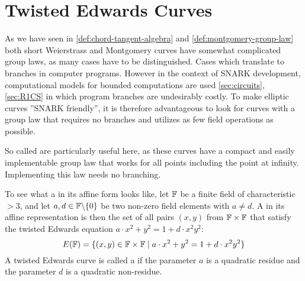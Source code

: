 
\section{Twisted Edwards Curves}\label{sec:edwards}
As we have seen in \ref{def:chord-tangent-algebra} and \ref{def:montgomery-group-law} both short Weierstrass and Montgomery curves have somewhat complicated group laws, as many cases have to be distinguished. Cases which translate to branches in computer programs. However in the context of SNARK development, computational models for bounded computations are used \ref{sec:circuits}, \ref{sec:R1CS} in which program branches are undesirably costly.  To make elliptic curves ''SNARK friendly'', it is therefore advantageous to look for curves with a group law that requires no branches and utilizes as few field operations as possible.

So called  are particularly useful here, as these curves have a compact and easily implementable group law that works for all points including the point at infinity. Implementing this law needs no branching. 

To see what a  in its affine form looks like, let $\mathbb{F}$ be a finite field of characteristic $>3$, and let $a,d\in \mathbb{F}\backslash\{0\}$ be two non-zero field elements with $a\neq d$.  A  in its affine representation is then the set of all pairs $(x,y)$ from $\mathbb{F}\times \mathbb{F}$ that satisfy the twisted Edwards equation $a\cdot x^2+y^2= 1+d\cdot x^2y^2$:
\begin{equation}
E(\mathbb{F})=\{(x,y)\in\mathbb{F}\times\mathbb{F}\;|\; a\cdot x^2+y^2= 1+d\cdot x^2y^2\}
\end{equation} 
A twisted Edwards curve is called a  if the parameter $a$ is a quadratic residue and the parameter $d$ is a quadratic non-residue.

